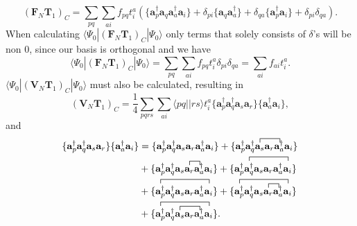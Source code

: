 \documentclass[a4paper,norsk,11pt,twoside]{report}
\begin{document}
\begin{equation}
(\textbf{F}_N \textbf{T}_1)_C = \sum_{pq} \sum_{ai} f_{pq} t_i^a \left(\{ \textbf{a}^{\dag}_p \textbf{a}_q \textbf{a}^{\dag}_a \textbf{a}_i \} + \delta_{pi} \{\textbf{a}_q \textbf{a}_a^{\dag} \} 
+ \delta_{qa} \{\textbf{a}_p^{\dag} \textbf{a}_i \} 
+ \delta_{pi} \delta_{qa} \right) .
\end{equation}
When calculating $\langle \Psi_0 | (\textbf{F}_N \textbf{T}_1)_C | \Psi_0 \rangle$ only terms that solely consists of $\delta$'s will be non 0, since our basis is orthogonal and we have
\begin{equation}
\langle \Psi_0 | (\textbf{F}_N \textbf{T}_1)_C | \Psi_0 \rangle =  \sum_{pq} \sum_{ai} f_{pq} t_i^a\delta_{pi} \delta_{qa} = \sum_{ai} f_{ai} t_i^a . \label{f_t1}
\end{equation}
$\langle \Psi_0 | (\textbf{V}_N \textbf{T}_1)_C | \Psi_0 \rangle$ must also be calculated, resulting in
\begin{equation}
(\textbf{V}_N \textbf{T}_1 )_C = \frac{1}{4} \sum_{pqrs} \sum_{ai} \langle pq||rs \rangle t_i^a \{\textbf{a}^{\dag}_p \textbf{a}^{\dag}_q \textbf{a}_s \textbf{a}_r \} \{\textbf{a}_a^{\dag} \textbf{a}_i \},
\end{equation}
and
\begin{align}
\{\textbf{a}^{\dag}_p \textbf{a}^{\dag}_q \textbf{a}_s \textbf{a}_r \} \{\textbf{a}_a^{\dag} \textbf{a}_i \} & = \{
\textbf{a}^{\dag}_p \textbf{a}^{\dag}_q \textbf{a}_s \textbf{a}_r \textbf{a}_a^{\dag} \textbf{a}_i 
\} 
+ 
\{ \textbf{a}^{\dag}_p \textbf{a}^{\dag}_q
\contraction{}{\textbf{a}_s}{\textbf{a}_r}{\textbf{a}_a^{\dag}}
 \textbf{a}_s \textbf{a}_r \textbf{a}_a^{\dag}
  \textbf{a}_i 
\}  \\ &
+ 
\{ \textbf{a}^{\dag}_p \textbf{a}^{\dag}_q \textbf{a}_s
\contraction{}{\textbf{a}_r}{}{\textbf{a}_a^{\dag}}
\textbf{a}_r \textbf{a}_a^{\dag}
\textbf{a}_i
\}
+ \{ \textbf{a}^{\dag}_p
\contraction{}{\textbf{a}^{\dag}_q}{\textbf{a}_s \textbf{a}_r \textbf{a}_a^{\dag}}{\textbf{a}_i}
\textbf{a}^{\dag}_q \textbf{a}_s \textbf{a}_r \textbf{a}_a^{\dag} \textbf{a}_i \} \nonumber \\ &
+ \{
\contraction{}{\textbf{a}^{\dag}_p}{\textbf{a}^{\dag}_q \textbf{a}_s \textbf{a}_r \textbf{a}_a^{\dag}}{\textbf{a}_i}
\textbf{a}^{\dag}_p \textbf{a}^{\dag}_q \textbf{a}_s \textbf{a}_r \textbf{a}_a^{\dag} \textbf{a}_i
\}
+ \{
\contraction{}{\textbf{a}^{\dag}_p}{\textbf{a}^{\dag}_q \textbf{a}_s \textbf{a}_r \textbf{a}_a^{\dag}}{\textbf{a}_i}
\contraction{\textbf{a}^{\dag}_p \textbf{a}^{\dag}_q \textbf{a}_s}{\textbf{a}_r}{}{\textbf{a}_a^{\dag}}
\textbf{a}^{\dag}_p \textbf{a}^{\dag}_q \textbf{a}_s \textbf{a}_r \textbf{a}_a^{\dag} \textbf{a}_i
\} \nonumber \\ &
+ \{
\contraction{}{\textbf{a}^{\dag}_p}{\textbf{a}^{\dag}_q \textbf{a}_s \textbf{a}_r \textbf{a}_a^{\dag}}{\textbf{a}_i}
\contraction{\textbf{a}^{\dag}_p \textbf{a}^{\dag}_q}{\textbf{a}_s}{\textbf{a}_r}{\textbf{a}_a^{\dag}}
\textbf{a}^{\dag}_p \textbf{a}^{\dag}_q \textbf{a}_s \textbf{a}_r \textbf{a}_a^{\dag} \textbf{a}_i
\} . \nonumber
\end{align}
\end{document}

